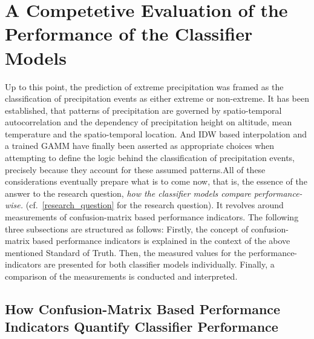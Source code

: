 \documentclass[
  12pt,
]{article}
\begin{document}
\hypertarget{a-competetive-evaluation-of-the-performance-of-the-classifier-models}{%
\section{A Competetive Evaluation of the Performance of the Classifier
Models}\label{a-competetive-evaluation-of-the-performance-of-the-classifier-models}}

Up to this point, the prediction of extreme precipitation was framed as
the classification of precipitation events as either extreme or
non-extreme. It has been established, that patterns of precipitation are
governed by spatio-temporal autocorrelation and the dependency of
precipitation height on altitude, mean temperature and the
spatio-temporal location. And IDW based interpolation and a trained GAMM
have finally been asserted as appropriate choices when attempting to
define the logic behind the classification of precipitation events,
precisely because they account for these assumed patterns.\newline All
of these considerations eventually prepare what is to come now, that is,
the essence of the answer to the research question,
\textit{how the classifier models compare performance-wise.}
(cf.~\ref{research_question} for the research question). It revolves
around measurements of confusion-matrix based performance indicators.
The following three subsections are structured as follows:\newline
Firstly, the concept of confusion-matrix based performance indicators is
explained in the context of the above mentioned Standard of Truth. Then,
the measured values for the performance-indicators are presented for
both classifier models individually. Finally, a comparison of the
measurements is conducted and interpreted.

\hypertarget{how-confusion-matrix-based-performance-indicators-quantify-classifier-performance}{%
\subsection{How Confusion-Matrix Based Performance Indicators Quantify
Classifier
Performance}\label{how-confusion-matrix-based-performance-indicators-quantify-classifier-performance}}
\end{document}
